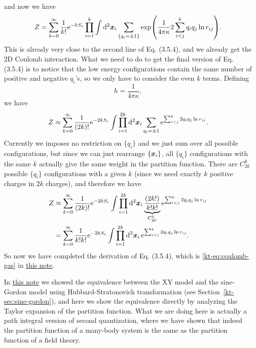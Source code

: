 \documentclass[hyperref, a4paper]{article}
\newcommand*{\ee}{\mathrm{e}}
\newcommand{\ktnote}{\href{../topological-phases-reading-notes/kt.pdf}{this note}}
\begin{document}
and now we have 
\begin{equation}
    Z = \sum_{k=0}^\infty \frac{1}{k!} \ee^{- k S_\text{c}} \prod_{i=1}^k \int \dd[2]{\vb*{x}_i} \sum_{\{q_i = \pm 1\}} \exp(\frac{1}{4 \pi \kappa} 2 \sum_{i < j}^k q_i q_j \ln r_{ij}).
\end{equation}
This is already very close to the second line of Eq. (3.5.4), and we already get the 2D Coulomb interaction. 
What we need to do to get the final version of Eq. (3.5.4) is to notice that the low energy configurations 
contain the same number of positive and negative $q_i$'s, so we only have to consider the even $k$ terms. 
Defining
\begin{equation}
    h = \frac{1}{4 \pi \kappa},
\end{equation}
we have 
\[
    Z \approx \sum_{k=0}^\infty \frac{1}{(2k)!} \ee^{- 2 k S_\text{c}} \int \prod_{i=1}^{2k} \dd[2]{\vb*{x}_i} \sum_{q_i = \pm 1} \ee^{\sum_{i < j}^k 2 q_i q_j \ln r_{ij}}.
\]
Currently we imposes no restriction on $\{q_i\}$ and we just sum over all possible configurations, but since 
we can just rearrange $\{\vb*{x}_i\}$, all $\{q_i\}$ configurations with the same $k$ actually give the same 
weight in the partition function. There are $C_{2k}^k$ possible $\{q_i\}$ configurations with a given $k$ (since
we need exactly $k$ positive charges in $2k$ charges), and therefore we have 
\[
    \begin{aligned}
        Z &\approx \sum_{k=0}^\infty \frac{1}{(2k)!} \ee^{- 2 k S_\text{c}} \int \prod_{i=1}^{2k} \dd[2]{\vb*{x}_i} \underbrace{\frac{(2k!)}{k! k!}}_{C_{2k}^k} \ee^{\sum_{i < j}^k 2 q_i q_j \ln r_{ij}} \\
        &= \sum_{k=0}^\infty \frac{1}{k! k!} \ee^{- 2 k S_\text{c}} \int \prod_{i=1}^{2k} \dd[2]{\vb*{x}_i} \ee^{\sum_{i < j}^k 2 q_i q_j \ln r_{ij}}.
    \end{aligned}
\]
So now we have completed the derivation of Eq. (3.5.4), which is \eqref{kt-eq:coulomb-gas} in \ktnote.

In \ktnote{} we showed the equivalence between the XY model and the sine-Gordon model using Hubbard-Stratonovich
transformation (see Section~\ref{kt-sec:sine-gordon}), and here we show the equivalence directly by analyzing 
the Taylor expansion of the partition function. What we are doing here is actually a path integral version of 
second quantization, where we have shown that indeed the partition function of a many-body system is the 
same as the partition function of a field theory. 
\end{document}
